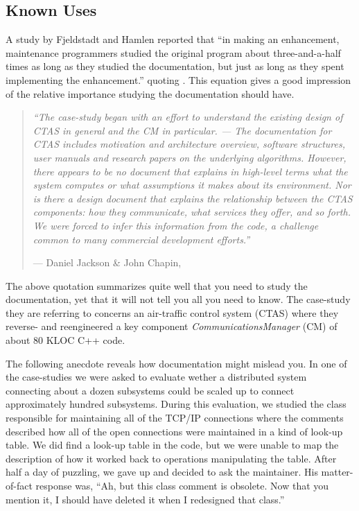 \documentclass[a4paper,10pt,twoside]{book}
\begin{document}
\subsection*{Known Uses}

A study by Fjeldstadt and Hamlen reported that ``in making an enhancement, maintenance programmers studied the original program about three-and-a-half times as long as they studied the documentation, but just as long as they spent implementing the enhancement.'' \cite{Corb89a} quoting \cite{Fjel79a}. This equation gives a good impression of the relative importance studying the documentation should have.

\begin{quotation}
\noindent
\emph{``The case-study began with an effort to understand the existing design of CTAS in general and the CM in particular. --- The documentation for CTAS includes motivation and architecture overview, software structures, user manuals and research papers on the underlying algorithms. However, there appears to be no document that explains in high-level terms what the system computes or what assumptions it makes about its environment. Nor is there a design document that explains the relationship between the CTAS components: how they communicate, what services they offer, and so forth. We were forced to infer this information from the code, a challenge common to many commercial development efforts.''}

\hfill --- Daniel Jackson \& John Chapin, \cite{Jack00a}
\end{quotation}

The above quotation summarizes quite well that you need to study the documentation, yet that it will not tell you all you need to know. The case-study they are referring to concerns an air-traffic control system (CTAS) where they reverse- and reengineered a key component \emph{Communications\-Manager} (CM) of about 80 KLOC C++ code.

The following anecdote reveals how documentation might mislead you. In one of the  case-studies we were asked to evaluate wether a distributed system connecting about a dozen subsystems could be scaled up to connect approximately hundred subsystems. During this evaluation, we studied the class responsible for maintaining all of the TCP/IP connections where the comments described how all of the open connections were maintained in a kind of look-up table. We did find a look-up table in the code, but we were unable to map the description of how it worked back to operations manipulating the table. After half a day of puzzling, we gave up and decided to ask the maintainer. His matter-of-fact response was, ``Ah, but this class comment is obsolete. Now that you mention it, I should have deleted it when I redesigned that class.''
\end{document}
